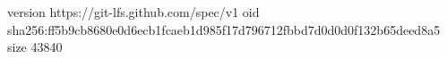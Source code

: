 version https://git-lfs.github.com/spec/v1
oid sha256:ff5b9cb8680e0d6ecb1fcaeb1d985f17d796712fbbd7d0d0d0f132b65deed8a5
size 43840
